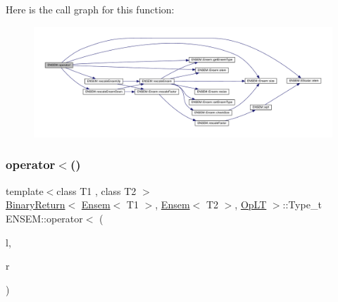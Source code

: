 Here is the call graph for this function\+:\nopagebreak
\begin{figure}[H]
\begin{center}
\leavevmode
\includegraphics[width=350pt]{d1/d9e/group__eensem_ga6a5de93e7f9569ae6390f831343a0430_cgraph}
\end{center}
\end{figure}
\mbox{\label{group__eensem_ga1d5f68e8b9ac25bf882bfdfda50cf24b}} 
\subsubsection{\texorpdfstring{operator$<$()}{operator<()}\hspace{0.1cm}{\footnotesize\ttfamily [1/3]}}
{\footnotesize\ttfamily template$<$class T1 , class T2 $>$ \\
\mbox{\hyperlink{structENSEM_1_1BinaryReturn}{Binary\+Return}}$<$ \mbox{\hyperlink{classENSEM_1_1Ensem}{Ensem}}$<$ T1 $>$, \mbox{\hyperlink{classENSEM_1_1Ensem}{Ensem}}$<$ T2 $>$, \mbox{\hyperlink{structENSEM_1_1OpLT}{Op\+LT}} $>$\+::Type\+\_\+t E\+N\+S\+E\+M\+::operator$<$ (\begin{DoxyParamCaption}\item[{const \mbox{\hyperlink{classENSEM_1_1Ensem}{Ensem}}$<$ T1 $>$ \&}]{l,  }\item[{const \mbox{\hyperlink{classENSEM_1_1Ensem}{Ensem}}$<$ T2 $>$ \&}]{r }\end{DoxyParamCaption})\hspace{0.3cm}{\ttfamily [inline]}}

